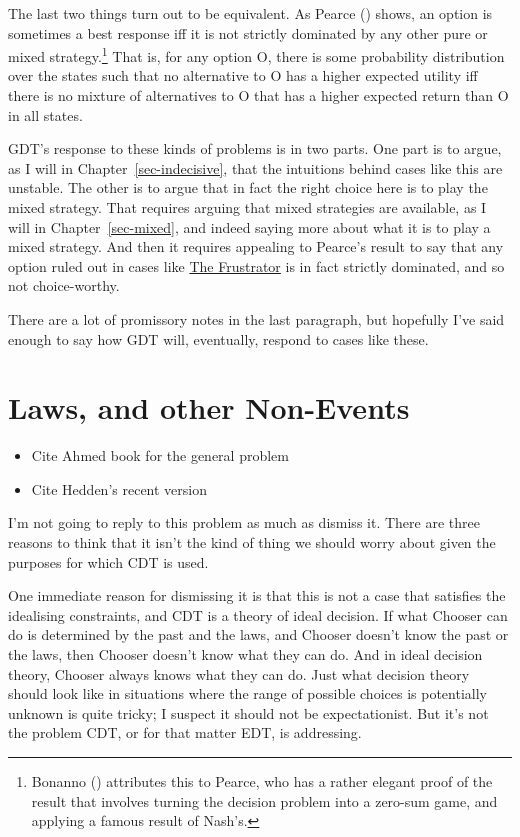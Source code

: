 \documentclass[
  12pt,
  letterpaper,
  DIV=11,
  numbers=noendperiod]{scrreprt}
\providecommand{\tightlist}{%
  \setlength{\itemsep}{0pt}\setlength{\parskip}{0pt}}\usepackage{longtable,booktabs,array}
\begin{document}
The last two things turn out to be equivalent. As Pearce
() shows, an option is sometimes a best
response iff it is not strictly dominated by any other pure or mixed
strategy.\footnote{Bonanno ()
  attributes this to Pearce, who has a rather elegant proof of the
  result that involves turning the decision problem into a zero-sum
  game, and applying a famous result of Nash's.} That is, for any option
O, there is some probability distribution over the states such that no
alternative to O has a higher expected utility iff there is no mixture
of alternatives to O that has a higher expected return than O in all
states.

GDT's response to these kinds of problems is in two parts. One part is
to argue, as I will in Chapter~\ref{sec-indecisive}, that the intuitions
behind cases like this are unstable. The other is to argue that in fact
the right choice here is to play the mixed strategy. That requires
arguing that mixed strategies are available, as I will in
Chapter~\ref{sec-mixed}, and indeed saying more about what it is to play
a mixed strategy. And then it requires appealing to Pearce's result to
say that any option ruled out in cases like
\hyperref[tbl-frustrator]{The Frustrator} is in fact strictly dominated,
and so not choice-worthy.

There are a lot of promissory notes in the last paragraph, but hopefully
I've said enough to say how GDT will, eventually, respond to cases like
these.

\section{Laws, and other Non-Events}\label{sec-laws-events}

\begin{itemize}
\tightlist
\item
  Cite Ahmed book for the general problem
\item
  Cite Hedden's recent version
\end{itemize}

I'm not going to reply to this problem as much as dismiss it. There are
three reasons to think that it isn't the kind of thing we should worry
about given the purposes for which CDT is used.

One immediate reason for dismissing it is that this is not a case that
satisfies the idealising constraints, and CDT is a theory of ideal
decision. If what Chooser can do is determined by the past and the laws,
and Chooser doesn't know the past or the laws, then Chooser doesn't know
what they can do. And in ideal decision theory, Chooser always knows
what they can do. Just what decision theory should look like in
situations where the range of possible choices is potentially unknown is
quite tricky; I suspect it should not be expectationist. But it's not
the problem CDT, or for that matter EDT, is addressing.
\end{document}

